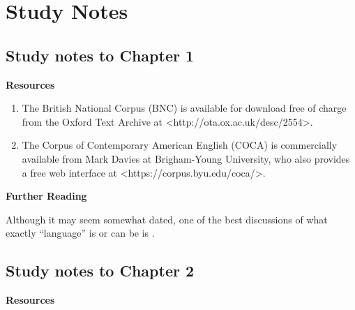\chapter{Study Notes}
\label{ch:studynotes}

\section{Study notes to Chapter 1}
\label{sec:studynotes01}

\textbf{Resources}

\begin{enumerate}
  \item The British National Corpus (BNC) is available for download free of charge from the Oxford Text Archive at <http://ota.ox.ac.uk/desc/2554>.
  \item The Corpus of Contemporary American English (COCA) is commercially available from Mark Davies at Brigham-Young University, who also provides a free web interface at <https://corpus.byu.edu/coca/>.
\end{enumerate}

\textbf{Further Reading}

Although it may seem somewhat dated, one of the best discussions of what exactly ``language'' is or can be is \citet{lyons_language_1981}.

\section{Study notes to Chapter 2}
\label{sec:studynotes02}

\textbf{Resources}

